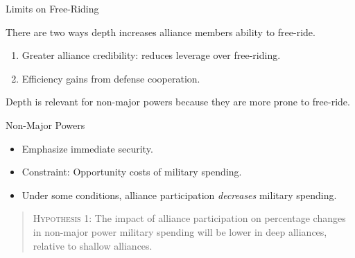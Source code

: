\documentclass[12pt]{beamer}
\begin{document}

\begin{frame}{Limits on Free-Riding}

There are two ways depth increases alliance members ability to free-ride. 

\begin{enumerate}
\pause
\item Greater alliance credibility: reduces leverage over free-riding.   
\pause
\item Efficiency gains from defense cooperation.  
\end{enumerate}

\end{frame}


\begin{frame}[standout]

Depth is relevant for non-major powers because they are more prone to free-ride. 

\end{frame}



\begin{frame}{Non-Major Powers}

\begin{itemize}
\item Emphasize immediate security.
\pause
\item Constraint: Opportunity costs of military spending.  
\pause
\item Under some conditions, alliance participation \emph{decreases} military spending. 
\end{itemize} 

\end{frame}


\begin{frame}[standout]

\begin{quote}
\textsc{Hypothesis 1}: The impact of alliance participation on percentage changes in non-major power military spending will be lower in deep alliances, relative to shallow alliances.
\end{quote} 


\end{frame}

\end{document}
